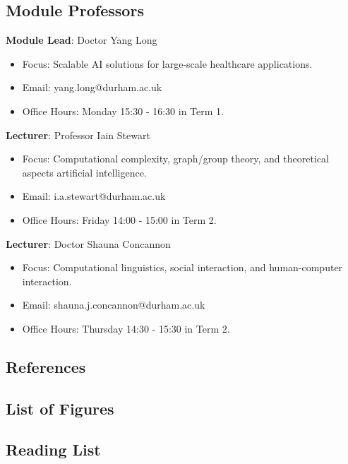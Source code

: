 \subsection{Module Professors}

\textbf{Module Lead}: Doctor Yang Long 

\begin{itemize}\label{modulelead-yanglong}
    \item Focus: Scalable AI solutions for large-scale healthcare applications.
    \item Email: yang.long@durham.ac.uk
    \item Office Hours: Monday 15:30 - 16:30 in Term 1.
\end{itemize}

\textbf{Lecturer}: Professor Iain Stewart

\begin{itemize}\label{lecturer-iainstewart}
    \item Focus: Computational complexity, graph/group theory, and theoretical aspects artificial intelligence.
    \item Email: i.a.stewart@durham.ac.uk
    \item Office Hours: Friday 14:00 - 15:00 in Term 2.
\end{itemize}

\textbf{Lecturer}: Doctor Shauna Concannon

\begin{itemize}\label{lecturer-shaunaconcannon}
    \item Focus: Computational linguistics, social interaction, and human-computer interaction.
    \item Email: shauna.j.concannon@durham.ac.uk
    \item Office Hours: Thursday 14:30 - 15:30 in Term 2.
\end{itemize}

\subsection{References}

\subsection{List of Figures}

\subsection{Reading List}

